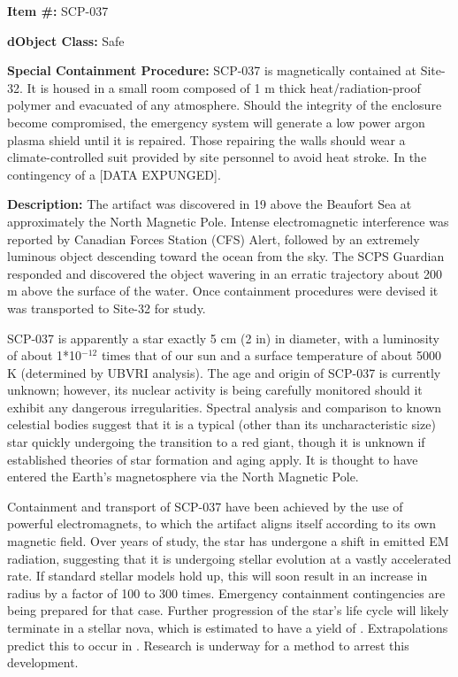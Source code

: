 
\textbf{Item \#:} SCP-037

\textbf{dObject Class:} Safe

\textbf{Special Containment Procedure:} SCP-037 is magnetically contained at Site-32. It is housed in a small room composed of 1 m thick heat/radiation-proof polymer and evacuated of any atmosphere. Should the integrity of the enclosure become compromised, the emergency system will generate a low power argon plasma shield until it is repaired. Those repairing the walls should wear a climate-controlled suit provided by site personnel to avoid heat stroke. In the contingency of a [DATA EXPUNGED].

\textbf{Description:} The artifact was discovered in 19 above the Beaufort Sea at approximately the North Magnetic Pole. Intense electromagnetic interference was reported by Canadian Forces Station (CFS) Alert, followed by an extremely luminous object descending toward the ocean from the sky. The SCPS Guardian responded and discovered the object wavering in an erratic trajectory about 200 m above the surface of the water. Once containment procedures were devised it was transported to Site-32 for study.

SCP-037 is apparently a star exactly 5 cm (2 in) in diameter, with a luminosity of about 1*10$^{-12}$ times that of our sun and a surface temperature of about 5000 K (determined by UBVRI analysis). The age and origin of SCP-037 is currently unknown; however, its nuclear activity is being carefully monitored should it exhibit any dangerous irregularities. Spectral analysis and comparison to known celestial bodies suggest that it is a typical (other than its uncharacteristic size) star quickly undergoing the transition to a red giant, though it is unknown if established theories of star formation and aging apply. It is thought to have entered the Earth's magnetosphere via the North Magnetic Pole.

Containment and transport of SCP-037 have been achieved by the use of powerful electromagnets, to which the artifact aligns itself according to its own magnetic field. Over  years of study, the star has undergone a shift in emitted EM radiation, suggesting that it is undergoing stellar evolution at a vastly accelerated rate. If standard stellar models hold up, this will soon result in an increase in radius by a factor of 100 to 300 times. Emergency containment contingencies are being prepared for that case. Further progression of the star's life cycle will likely terminate in a stellar nova, which is estimated to have a yield of . Extrapolations predict this to occur in . Research is underway for a method to arrest this development.
